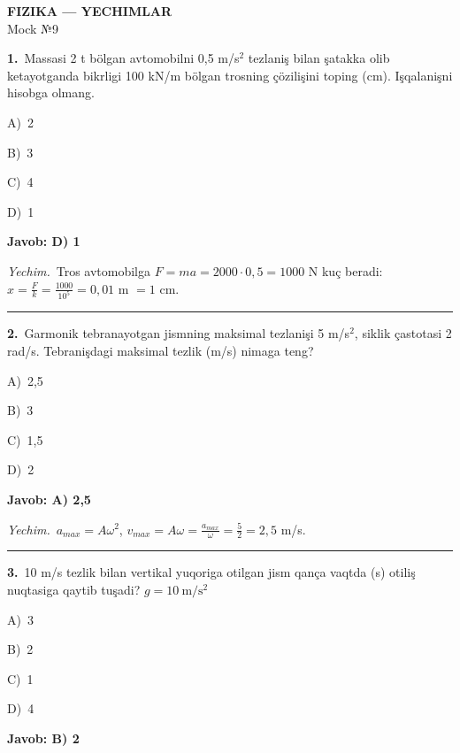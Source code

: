 \documentclass[11pt,a4paper]{article}
\newcommand{\opt}[2]{\hspace*{4mm}#1)\ #2\par}
\begin{document}
\begin{center}{\Large\textbf{FIZIKA — YECHIMLAR}}\\[2pt]{\large Mock №9}\end{center}
\noindent\begin{minipage}{\linewidth}
\textbf{1.}\ Massasi 2 t bölgan avtomobilni 0,5 m/s$^{2}$ tezlaniş bilan şatakka olib ketayotganda bikrligi 100 kN/m bölgan trosning çözilişini toping (cm). Işqalanişni hisobga olmang.\par\smallskip
\opt{A}{2}
\opt{B}{3}
\opt{C}{4}
\opt{D}{1}
\end{minipage}\vspace{2pt}\par
\noindent\colorbox{gray!12}{\parbox{\dimexpr\linewidth-2\fboxsep}{\textbf{Javob: D) 1}}}\par\smallskip
\noindent\textit{Yechim.}\ Tros avtomobilga $F=ma=2000\cdot0{,}5=1000$ N kuç beradi: $x=\frac{F}{k}=\frac{1000}{10^5}=0{,}01$ m $=1$ cm.\par\par\medskip\hrule\medskip
{}\noindent\begin{minipage}{\linewidth}
\textbf{2.}\ Garmonik tebranayotgan jismning maksimal tezlanişi 5 m/s$^{2}$, siklik çastotasi 2 rad/s. Tebranişdagi maksimal tezlik (m/s) nimaga teng?\par\smallskip
\opt{A}{2,5}
\opt{B}{3}
\opt{C}{1,5}
\opt{D}{2}
\end{minipage}\vspace{2pt}\par
\noindent\colorbox{gray!12}{\parbox{\dimexpr\linewidth-2\fboxsep}{\textbf{Javob: A) 2,5}}}\par\smallskip
\noindent\textit{Yechim.}\ $a_{max}=A\omega^2$, $v_{max}=A\omega=\frac{a_{max}}{\omega}=\frac52=2{,}5$ m/s.\par\par\medskip\hrule\medskip
{}\noindent\begin{minipage}{\linewidth}
\textbf{3.}\ 10 m/s tezlik bilan vertikal yuqoriga otilgan jism qança vaqtda (s) otiliş nuqtasiga qaytib tuşadi? $g=10\ \mathrm{m/s^2}$\par\smallskip
\opt{A}{3}
\opt{B}{2}
\opt{C}{1}
\opt{D}{4}
\end{minipage}\vspace{2pt}\par
\noindent\colorbox{gray!12}{\parbox{\dimexpr\linewidth-2\fboxsep}{\textbf{Javob: B) 2}}}\par\smallskip
\end{document}
